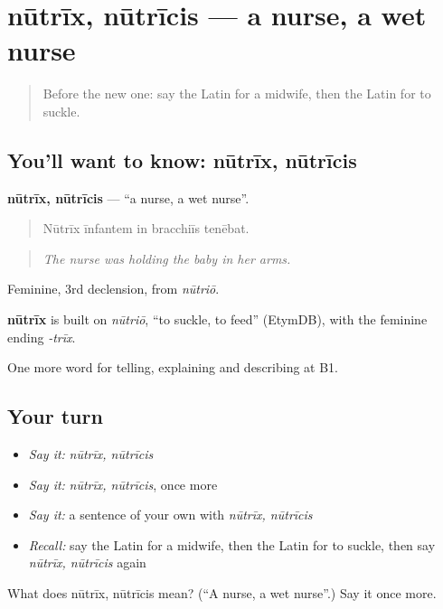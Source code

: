 \section[nūtrīx, nūtrīcis]{nūtrīx, nūtrīcis — a nurse, a wet nurse}

\label{lesson:LA-C323-nutrix}



\begin{quote}
Before the new one: say the Latin for a midwife, then the Latin for to suckle.
\end{quote}

\subsection*{You'll want to know: nūtrīx, nūtrīcis}
\textbf{nūtrīx, nūtrīcis} — \textquotedblleft{}a nurse, a wet nurse\textquotedblright{}.

\begin{quote}
Nūtrīx īnfantem in bracchiīs tenēbat.
\end{quote}

\begin{quote}
\emph{The nurse was holding the baby in her arms.}
\end{quote}

Feminine, 3rd declension, from \emph{nūtriō}.

\begin{cousinweb}
\textbf{nūtrīx} is built on \emph{nūtriō}, \textquotedblleft{}to suckle, to feed\textquotedblright{} (EtymDB), with the feminine ending \emph{-trīx}.
\end{cousinweb}

\begin{grammarlens}[title={What you've built}]
One more word for telling, explaining and describing at B1.
\end{grammarlens}

\subsection*{Your turn}
\begin{itemize}
\raggedright
  \item \emph{Say it:} \emph{nūtrīx, nūtrīcis}
  \item \emph{Say it:} \emph{nūtrīx, nūtrīcis}, once more
  \item \emph{Say it:} a sentence of your own with \emph{nūtrīx, nūtrīcis}
  \item \emph{Recall:} say the Latin for a midwife, then the Latin for to suckle, then say \emph{nūtrīx, nūtrīcis} again
\end{itemize}

\begin{tcolorbox}[breakable,colback=teal!4,colframe=teal!35!black,title={Before you move on}]
What does nūtrīx, nūtrīcis mean? (\textquotedblleft{}A nurse, a wet nurse\textquotedblright{}.) Say it once more.
\end{tcolorbox}
